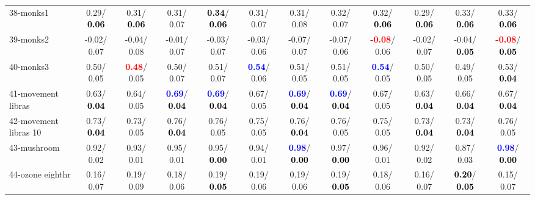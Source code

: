 \begin{table}[h]
\begin{center}
{\begin{tabular}{lc|c|c|c|c|c|c|c|c|c|c}
38-monks1 &   0.29/\textcolor{black}{\textbf{  0.06}} &   0.31/\textcolor{black}{\textbf{  0.06}} &   0.31/  0.07 & \textcolor{black}{\textbf{  0.34}}/\textcolor{black}{\textbf{  0.06}} &   0.31/  0.07 &   0.31/  0.08 &   0.32/  0.07 &   0.32/\textcolor{black}{\textbf{  0.06}} &   0.29/\textcolor{black}{\textbf{  0.06}} &   0.33/\textcolor{black}{\textbf{  0.06}} &   0.33/\textcolor{black}{\textbf{  0.06}} \\
39-monks2 &  -0.02/  0.07 &  -0.04/  0.08 &  -0.01/  0.07 &  -0.03/  0.07 &  -0.03/  0.06 &  -0.07/  0.07 &  -0.07/  0.06 & \textcolor{red}{\textbf{ -0.08}}/  0.06 &  -0.02/  0.07 &  -0.04/\textcolor{black}{\textbf{  0.05}} & \textcolor{red}{\textbf{ -0.08}}/\textcolor{black}{\textbf{  0.05}} \\ \hline
40-monks3 &   0.50/  0.05 & \textcolor{red}{\textbf{  0.48}}/  0.05 &   0.50/  0.07 &   0.51/  0.07 & \textcolor{blue}{\textbf{  0.54}}/  0.06 &   0.51/  0.05 &   0.51/  0.05 & \textcolor{blue}{\textbf{  0.54}}/  0.05 &   0.50/  0.05 &   0.49/  0.05 &   0.53/\textcolor{black}{\textbf{  0.04}} \\
41-movement libras &   0.63/\textcolor{black}{\textbf{  0.04}} &   0.64/  0.05 & \textcolor{blue}{\textbf{  0.69}}/\textcolor{black}{\textbf{  0.04}} & \textcolor{blue}{\textbf{  0.69}}/\textcolor{black}{\textbf{  0.04}} &   0.67/  0.05 & \textcolor{blue}{\textbf{  0.69}}/\textcolor{black}{\textbf{  0.04}} & \textcolor{blue}{\textbf{  0.69}}/\textcolor{black}{\textbf{  0.04}} &   0.67/  0.05 &   0.63/\textcolor{black}{\textbf{  0.04}} &   0.66/\textcolor{black}{\textbf{  0.04}} &   0.67/\textcolor{black}{\textbf{  0.04}} \\
42-movement libras 10 &   0.73/\textcolor{black}{\textbf{  0.04}} &   0.73/  0.05 &   0.76/\textcolor{black}{\textbf{  0.04}} &   0.76/  0.05 &   0.75/  0.05 &   0.76/\textcolor{black}{\textbf{  0.04}} &   0.76/  0.05 &   0.75/  0.05 &   0.73/\textcolor{black}{\textbf{  0.04}} &   0.73/\textcolor{black}{\textbf{  0.04}} &   0.76/  0.05 \\
43-mushroom &   0.92/  0.02 &   0.93/  0.01 &   0.95/  0.01 &   0.95/\textcolor{black}{\textbf{  0.00}} &   0.94/  0.01 & \textcolor{blue}{\textbf{  0.98}}/\textcolor{black}{\textbf{  0.00}} &   0.97/\textcolor{black}{\textbf{  0.00}} &   0.96/  0.01 &   0.92/  0.02 &   0.87/  0.03 & \textcolor{blue}{\textbf{  0.98}}/\textcolor{black}{\textbf{  0.00}} \\
44-ozone eighthr &   0.16/  0.07 &   0.19/  0.09 &   0.18/  0.06 &   0.19/\textcolor{black}{\textbf{  0.05}} &   0.19/  0.06 &   0.19/  0.06 &   0.19/\textcolor{black}{\textbf{  0.05}} &   0.18/  0.06 &   0.16/  0.07 & \textcolor{black}{\textbf{  0.20}}/\textcolor{black}{\textbf{  0.05}} &   0.15/  0.07 \\

\end{tabular}}
\end{center}
\end{table}
